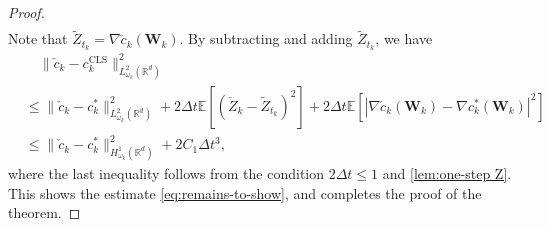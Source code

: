 \documentclass[10pt,a4paper]{amsart}
\numberwithin{equation}{section}
\numberwithin{algorithm}{section}
\theoremstyle{plain}
\theoremstyle{remark}
\newcommand{\op}{\operatorname}
\newcommand{\R}{\mathbb{R}}
\begin{document}
\begin{proof}
\begin{align*}
\end{align*}
Note that $\tilde{Z}_{t_k} = \nabla \check{c}_k(\mathbf{W}_k)$. By subtracting and adding $\tilde{Z}_{t_k}$, we have
\begin{align*}
    &\quad \|\check{c}_k - c_k^{\op{CLS}}\|_{{L}^2_{\omega_{k}}(\R^d)}^2 \\
    &\le \|\check{c}_k - c_k^*\|_{{L}^2_{\omega_{k}}(\R^d)}^2 + 2\Delta t \mathbb{E}\left[ (\check{Z}_k - \tilde{Z}_{t_k})^2 \right] + 2\Delta t \mathbb{E}\left[ |\nabla \check{c}_k(\mathbf{W}_k) - \nabla c_k^*(\mathbf{W}_k)|^2 \right] \\
    &\le \|\check{c}_k - c_k^*\|_{H^1_{ \omega_{k}}(\R^d)}^2 + 2C_1\Delta t^3,
\end{align*}
where the last inequality follows from the condition $2\Delta t \le 1$ and \cref{lem:one-step Z}. This shows the estimate \cref{eq:remains-to-show}, and completes the proof of the theorem.
\end{proof}
\end{document}
